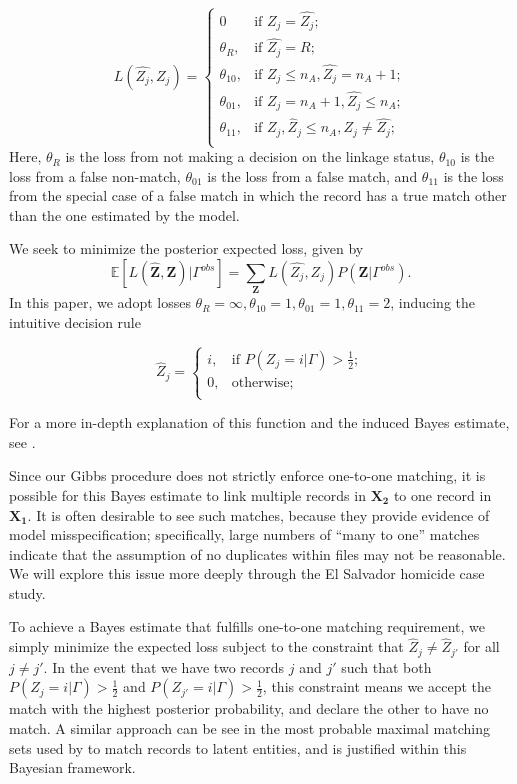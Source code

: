 \documentclass[12pt,letterpaper]{article}
\newcommand{\1}[1]{\mathbb{I}\!\left[#1\right]} %
\begin{document}
\[L(\hat{Z_j}, Z_j)=\begin{cases} 
	0  & \text{if } Z_j = \hat{Z_j}; \\
	\theta_R,  & \text{if } \hat{Z_j} = R; \\
	\theta_{10},  & \text{if } Z_j \leq n_A,\hat{Z_j} = n_A + 1 ; \\
	\theta_{01},  & \text{if } Z_j = n_A + 1,\hat{Z_j} \leq n_A ; \\
	\theta_{11},  & \text{if } Z_j, \hat{Z}_j \leq n_A, Z_j \neq \hat{Z_j} ; \\
\end{cases}\] Here, \(\theta_R\) is the loss from not making a decision
on the linkage status, \(\theta_{10}\) is the loss from a false
non-match, \(\theta_{01}\) is the loss from a false match, and
\(\theta_{11}\) is the loss from the special case of a false match in
which the record has a true match other than the one estimated by the
model. 

We seek to minimize the posterior expected loss, given by 
$$\mathbb{E}[L(\hat{\bm{Z}}, \bm{Z})|\Gamma^{obs}] = \sum_{\bm{Z}} L(\hat{Z_j}, Z_j)P(\bm{Z}|\Gamma^{obs}).$$
In this paper, we adopt losses $\theta_R = \infty, \theta_{10} = 1, \theta_{01} = 1, \theta_{11} = 2$, inducing the intuitive decision rule

\[\hat{Z}_j =\begin{cases} 
	i,  & \text{if } P(Z_j = i |\Gamma) > \frac{1}{2}; \\
	0,  & \text{otherwise} ; \\
\end{cases}\]

For a more in-depth explanation of this function and the induced Bayes
estimate, see \citep{sadinle_bayesian_2017}.

Since our Gibbs procedure does not strictly enforce one-to-one matching, it is possible for this Bayes estimate to link multiple records in $\bm{X_2}$ to one record in $\bm{X_1}$. It is often desirable to see such matches, because they provide evidence of model misspecification; specifically, large numbers of ``many to one'' matches indicate that the assumption of no duplicates within files may not be reasonable. We will explore this issue more deeply through the El Salvador homicide case study. 

To achieve a Bayes estimate that fulfills one-to-one matching requirement, we simply minimize the expected loss subject to the constraint that $\hat{Z}_j \neq \hat{Z}_{j'}$ for all $j \neq j'$. In the event that we have two records $j$ and $j'$ such that both $P(Z_j = i |\Gamma) > \frac{1}{2}$ and $ P(Z_{j'} = i |\Gamma) > \frac{1}{2}$, this constraint means we accept the match with the highest posterior probability, and declare the other to have no match.  A similar approach can be see in the most probable maximal matching sets used by \cite{steorts_bayesian_2016} to match records to latent entities, and is justified within this Bayesian framework.
\end{document}
